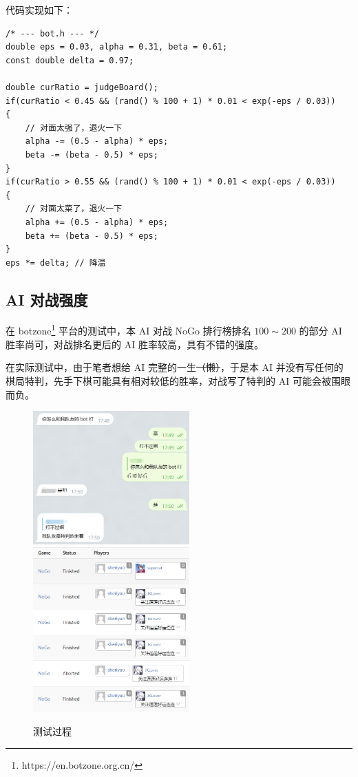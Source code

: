 \documentclass{noithesis}
\begin{document}
	代码实现如下：
	
	\begin{lstlisting}
/* --- bot.h --- */
double eps = 0.03, alpha = 0.31, beta = 0.61;
const double delta = 0.97;

double curRatio = judgeBoard();
if(curRatio < 0.45 && (rand() % 100 + 1) * 0.01 < exp(-eps / 0.03))
{
	// 对面太强了，退火一下
	alpha -= (0.5 - alpha) * eps;
	beta -= (beta - 0.5) * eps;
}
if(curRatio > 0.55 && (rand() % 100 + 1) * 0.01 < exp(-eps / 0.03))
{
	// 对面太菜了，退火一下
	alpha += (0.5 - alpha) * eps;
	beta += (beta - 0.5) * eps;
}
eps *= delta; // 降温
	\end{lstlisting}

	\subsection{AI 对战强度}
	
	在 botzone\footnote{https://en.botzone.org.cn/} 平台的测试中，本 AI 对战 NoGo 排行榜排名 $100\sim 200$ 的部分 AI 胜率尚可，对战排名更后的 AI 胜率较高，具有不错的强度。
	
	在实际测试中，由于笔者想给 AI 完整的一生\sout{（懒）}，于是本 AI 并没有写任何的棋局特判，先手下棋可能具有相对较低的胜率，对战写了特判的 AI 可能会被围眼而负。
	
	\begin{figure}[!htb]
		\centering
		
		\includegraphics[width=6cm]{img/teammate.png}
		\includegraphics[width=6cm]{img/pk.png}
		
		\caption{测试过程}
	\end{figure}
	
\end{document}
